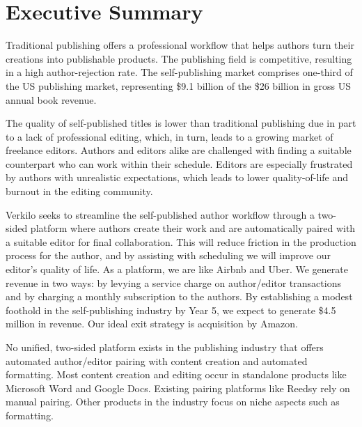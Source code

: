 \documentclass[10pt,openany]{book}
\begin{document}
      \listoftables
  
      \listoffigures
  
\newpage %

\pagestyle{fancy}
\hypertarget{executive-summary}{%
\chapter{Executive Summary}\label{executive-summary}}


Traditional publishing offers a professional workflow that helps authors
turn their creations into publishable products. The publishing field is
competitive, resulting in a high author-rejection rate. The
self-publishing market comprises one-third of the US publishing market,
representing \$9.1 billion of the \$26 billion in gross US annual book
revenue.

The quality of self-published titles is lower than traditional
publishing due in part to a lack of professional editing, which, in
turn, leads to a growing market of freelance editors. Authors and
editors alike are challenged with finding a suitable counterpart who can
work within their schedule. Editors are especially frustrated by authors
with unrealistic expectations, which leads to lower quality-of-life and
burnout in the editing community.

Verkilo seeks to streamline the self-published author workflow through a
two-sided platform where authors create their work and are automatically
paired with a suitable editor for final collaboration. This will reduce
friction in the production process for the author, and by assisting with
scheduling we will improve our editor's quality of life. As a platform,
we are like Airbnb and Uber. We generate revenue in two ways: by levying
a service charge on author/editor transactions and by charging a monthly
subscription to the authors. By establishing a modest foothold in the
self-publishing industry by Year 5, we expect to generate \$4.5 million
in revenue. Our ideal exit strategy is acquisition by Amazon.

No unified, two-sided platform exists in the publishing industry that
offers automated author/editor pairing with content creation and
automated formatting. Most content creation and editing occur in
standalone products like Microsoft Word and Google Docs. Existing
pairing platforms like Reedsy rely on manual pairing. Other products in
the industry focus on niche aspects such as formatting.
\end{document}

